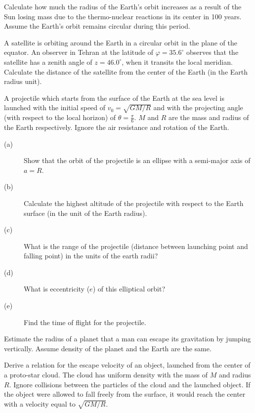 Calculate how much the radius of the Earth's orbit increases as a result of the
Sun losing mass due to the thermo-nuclear reactions in its center in 100 years.
Assume the Earth's orbit remains circular during this period.

A satellite is orbiting around the Earth in a circular orbit in the plane of
the equator. An observer in Tehran at the latitude of $\varphi = 35.6^\circ$
observes that the satellite has a zenith angle of $z = 46.0^\circ$, when it
transits the local meridian. Calculate the distance of the satellite from the
center of the Earth (in the Earth radius unit).

A projectile which starts from the surface of the Earth at the sea level is
launched with the initial speed of $v_0 = \sqrt{GM/R}$ and with the projecting
angle (with respect to the local horizon) of $\theta = \frac{\pi}{6}$. $M$ and
$R$ are the mass and radius of the Earth respectively. Ignore the air
resistance and rotation of the Earth.

\begin{description}
\item[(a)] Show that the orbit of the projectile is an ellipse with a
  semi-major axis of $a = R$.
\item[(b)] Calculate the highest altitude of the projectile with respect to the
  Earth surface (in the unit of the Earth radius).
\item[(c)] What is the range of the projectile (distance between launching
  point and falling point) in the units of the earth radii?
\item[(d)] What is eccentricity ($e$) of this elliptical orbit?
\item[(e)] Find the time of flight for the projectile.
\end{description}

Estimate the radius of a planet that a man can escape its gravitation by
jumping vertically. Assume density of the planet and the Earth are the same.

Derive a relation for the escape velocity of an object, launched from the
center of a proto-star cloud. The cloud has uniform density with the mass of
$M$ and radius $R$. Ignore collisions between the particles of the cloud and
the launched object. If the object were allowed to fall freely from the
surface, it would reach the center with a velocity equal to $\sqrt{GM/R}$.

